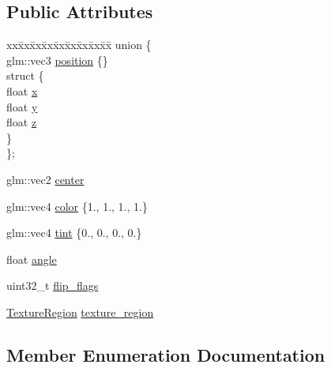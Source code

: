 \subsection*{Public Attributes}
\begin{DoxyCompactItemize}
\item 
\begin{tabbing}
xx\=xx\=xx\=xx\=xx\=xx\=xx\=xx\=xx\=\kill
union \{\\
\>glm::vec3 \hyperlink{classpixel_1_1graphics_1_1_sprite_a37c176937802e95f13da186ff7740504}{position} \{\}\\
\>struct \{\\
\>\>float \hyperlink{classpixel_1_1graphics_1_1_sprite_a74142f0afee8c7d2ee1228017756425f}{x}\\
\>\>float \hyperlink{classpixel_1_1graphics_1_1_sprite_a0ffb75d6a489e6ce3ba76027389d11dd}{y}\\
\>\>float \hyperlink{classpixel_1_1graphics_1_1_sprite_aab4803301c8480b03ab6a62370753694}{z}\\
\>\} \\
\}; \\

\end{tabbing}\item 
glm\+::vec2 \hyperlink{classpixel_1_1graphics_1_1_sprite_a0d777b08310cbd0e08d0d8162f3a1503}{center}
\item 
glm\+::vec4 \hyperlink{classpixel_1_1graphics_1_1_sprite_af99cdb2fb7cbef3155597017672f548f}{color} \{1., 1., 1., 1.\}
\item 
glm\+::vec4 \hyperlink{classpixel_1_1graphics_1_1_sprite_a09ba5e72c6a7bb5a994a521170e65cff}{tint} \{0., 0., 0., 0.\}
\item 
float \hyperlink{classpixel_1_1graphics_1_1_sprite_ac637be9b9aa5227a47393d182658577b}{angle}
\item 
uint32\+\_\+t \hyperlink{classpixel_1_1graphics_1_1_sprite_a95d3f0b1d6c8ff179af138018ff61f7e}{flip\+\_\+flags}
\item 
\hyperlink{structpixel_1_1graphics_1_1_texture_region}{Texture\+Region} \hyperlink{classpixel_1_1graphics_1_1_sprite_a0c8e41f26015ad6e94a8f2d85f6bc9df}{texture\+\_\+region}
\end{DoxyCompactItemize}


\subsection{Member Enumeration Documentation}
\mbox{\label{classpixel_1_1graphics_1_1_sprite_a899da5dbedfe7486c6b4d009a8171c13}} 
